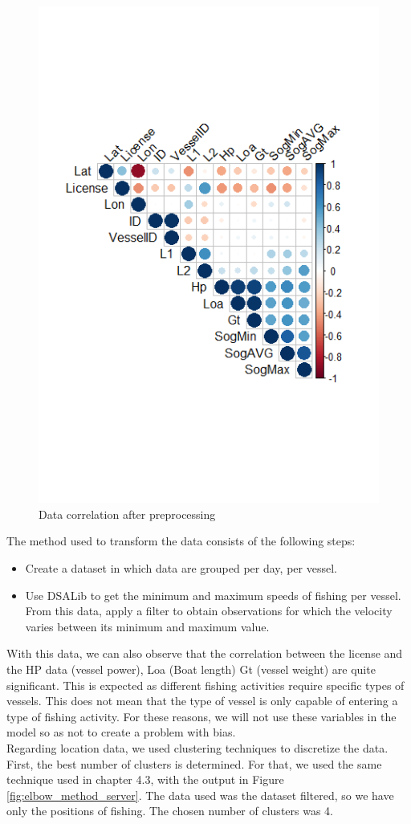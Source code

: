 \begin{figure}[h]
\centering
\includegraphics[width=0.7\linewidth]{Chapters/img/data_coor2.png}
\caption{Data correlation after preprocessing}
\label{fig:data_coor2}
\end{figure}
\newpage
The method used to transform the data consists of the following steps:
\begin{itemize}
\item Create a dataset in which data are grouped per day, per vessel.
\item Use DSALib to get the minimum and maximum speeds of fishing per vessel. From this data, apply a filter to obtain observations for which the velocity varies between its minimum and maximum value.

\end{itemize}

With this data, we can also observe that the correlation between the license and the HP data (vessel power), Loa (Boat length) Gt (vessel weight) are quite significant. This is expected as different fishing activities require specific types of vessels. This does not mean that the type of vessel is only capable of entering a type of fishing activity.
For these reasons, we will not use these variables in the model so as not to create a problem with bias.
\\
Regarding location data, we used clustering techniques to discretize the data.
First, the best number of clusters is determined. For that, we used the same technique used in chapter 4.3, with the output in Figure \ref{fig:elbow_method_server}. The data used was the dataset filtered, so we have only the positions of fishing. The chosen number of clusters was 4.

